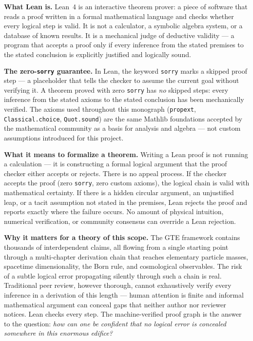 \documentclass[11pt,openany]{book}
\theoremstyle{remark}
\begin{document}
\begin{tcolorbox}[colback=gray!5,colframe=gray!60!black,
  title={What Is Lean Formalization?},breakable]

\textbf{What Lean is.}\quad
Lean~4 is an interactive theorem prover: a piece of software that reads a
proof written in a formal mathematical language and checks whether every
logical step is valid.
It is not a calculator, a symbolic algebra system, or a database of known
results.
It is a mechanical judge of deductive validity --- a program that accepts a
proof only if every inference from the stated premises to the stated
conclusion is explicitly justified and logically sound.

\medskip

\textbf{The zero-\texttt{sorry} guarantee.}\quad
In Lean, the keyword \texttt{sorry} marks a skipped proof step --- a
placeholder that tells the checker to assume the current goal without
verifying it.
A theorem proved with zero \texttt{sorry} has \emph{no} skipped steps: every
inference from the stated axioms to the stated conclusion has been
mechanically verified.
The axioms used throughout this monograph (\texttt{propext},
\texttt{Classical.choice}, \texttt{Quot.sound}) are the same Mathlib
foundations accepted by the mathematical community as a basis for analysis
and algebra --- not custom assumptions introduced for this project.

\medskip

\textbf{What it means to formalize a theorem.}\quad
Writing a Lean proof is not running a calculation --- it is constructing a
formal logical argument that the proof checker either accepts or rejects.
There is no appeal process.
If the checker accepts the proof (zero \texttt{sorry}, zero custom axioms),
the logical chain is valid with mathematical certainty.
If there is a hidden circular argument, an unjustified leap, or a tacit
assumption not stated in the premises, Lean rejects the proof and reports
exactly where the failure occurs.
No amount of physical intuition, numerical verification, or community
consensus can override a Lean rejection.

\medskip

\textbf{Why it matters for a theory of this scope.}\quad
The GTE framework contains thousands of interdependent claims, all flowing
from a single starting point through a multi-chapter derivation chain that
reaches elementary particle masses, spacetime dimensionality, the Born rule,
and cosmological observables.
The risk of a subtle logical error propagating silently through such a chain
is real.
Traditional peer review, however thorough, cannot exhaustively verify every
inference in a derivation of this length --- human attention is finite and
informal mathematical argument can conceal gaps that neither author nor
reviewer notices.
Lean checks every step.
The machine-verified proof graph is the answer to the question: \emph{how
can one be confident that no logical error is concealed somewhere in this
enormous edifice?}


\end{tcolorbox}
\end{document}
